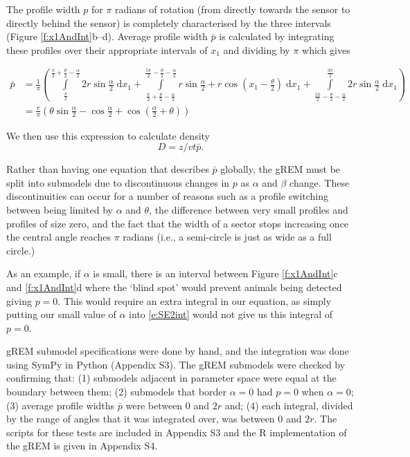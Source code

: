 \documentclass[a4paper,10pt,reqno,oneside]{amsart}
\begin{document}
The profile width $p$ for $\pi$ radians of rotation (from directly towards the sensor to directly behind the sensor) is completely characterised by the three intervals (Figure \ref{f:x1AndInt}b--d). Average profile width $\bar{p}$ is calculated by integrating these profiles over their appropriate intervals of $x_1$ and dividing by $\pi$ which gives

\begin{align}
    \bar{p} &=\frac{1}{\pi} \left(\int\limits_{\frac{\pi}{2}}^{\frac{\pi}{2} + \frac{\theta}{2} - \frac{\alpha}{2}}2 r \sin{\frac{\alpha}{2} }\;\mathrm{d}x_1+\int\limits_{\frac{\pi}{2} + \frac{\theta}{2} - \frac{\alpha}{2}}^{\frac{5 \pi}{2} - \frac{\theta}{2} - \frac{\alpha}{2}}r \sin{\frac{\alpha}{2} } + r \cos{\left (x_1 - \frac{\theta}{2} \right )}\;\mathrm{d}x_1+\int\limits_{\frac{5 \pi}{2} - \frac{\theta}{2} - \frac{\alpha}{2}}^{\frac{3 \pi}{2}}2 r \sin{\frac{\alpha}{2} }\;\mathrm{d}x_1\right) \label{e:SE2int}  \\
     &= \frac{r}{\pi} \left(\theta \sin{\frac{\alpha}{2} } - \cos{\frac{\alpha}{2} } + \cos{\left (\frac{\alpha}{2} + \theta \right )}\right) \label{e:SE2result}
\end{align}

We then use this expression to calculate density
\begin{equation}
\label{e:gas}
D = z/vt\bar{p}.
\end{equation}


Rather than having one equation that describes $\bar{p}$ globally, the gREM must be split into submodels due to discontinuous changes in $p$ as $\alpha$ and $\beta$ change. These discontinuities can occur for a number of reasons such as a profile switching between being limited by $\alpha$ and $\theta$, the difference between very small profiles and profiles of size zero, and the fact that the width of a sector stops increasing once the central angle reaches $\pi$ radians (i.e., a semi-circle is just as wide as a full circle.)

As an example, if $\alpha$ is small, there is an interval between Figure \ref{f:x1AndInt}c and \ref{f:x1AndInt}d where the `blind spot' would prevent animals being detected giving $p=0$. This would require an extra integral in our equation, as simply putting our small value of $\alpha$ into \ref{e:SE2int} would not give us this integral of $p=0$.

gREM submodel specifications were done by hand, and the integration was done using SymPy \citep{sympy} in Python (Appendix S3). The gREM submodels were checked by confirming that: (1) submodels adjacent in parameter space were equal at the boundary between them; (2) submodels that border $ \alpha = 0$ had $p = 0$ when $ \alpha = 0$; (3) average profile widths $\bar{p}$ were between 0 and $2r$ and; (4) each integral, divided by the range of angles that it was integrated over, was between 0 and $2r$. The scripts for these tests are included in Appendix S3 and the R \citep{R} implementation of the gREM is given in Appendix S4.  
\end{document}
